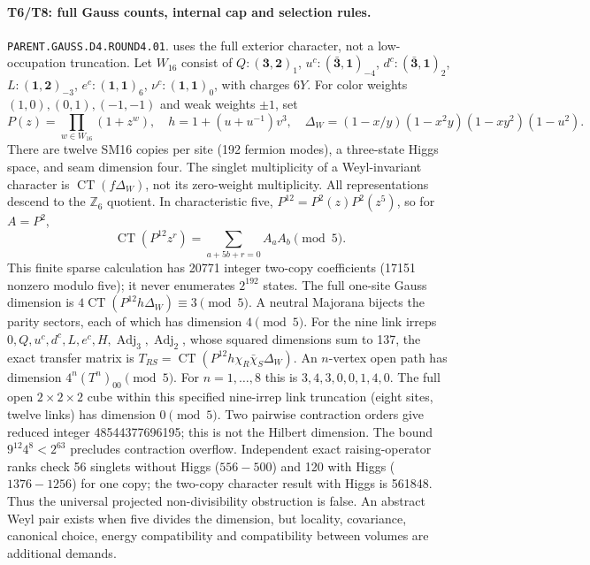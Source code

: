 \paragraph{T6/T8: full Gauss counts, internal cap and selection rules.}
\texttt{PARENT.GAUSS.D4.ROUND4.01}.
uses the full exterior character, not a low-occupation truncation.
Let $W_{16}$ consist of $Q:(\mathbf3,\mathbf2)_1$,
$u^c:(\bar{\mathbf3},\mathbf1)_{-4}$,
$d^c:(\bar{\mathbf3},\mathbf1)_2$, $L:(\mathbf1,\mathbf2)_{-3}$,
$e^c:(\mathbf1,\mathbf1)_6$, $\nu^c:(\mathbf1,\mathbf1)_0$, with charges $6Y$.
For color weights $(1,0),(0,1),(-1,-1)$ and weak weights $\pm1$, set
\[
 P(z)=\prod_{w\in W_{16}}(1+z^w),\quad
 h=1+(u+u^{-1})v^3,\quad
 \Delta_W=(1-x/y)(1-x^2y)(1-xy^2)(1-u^2).
\]
There are twelve SM16 copies per site (192 fermion modes), a three-state
Higgs space, and seam dimension four. The singlet multiplicity of a
Weyl-invariant character is $\operatorname{CT}(f\Delta_W)$, not its
zero-weight multiplicity. All representations descend to the $\mathbb Z_6$
quotient. In characteristic five,
$P^{12}=P^2(z)P^2(z^5)$, so for $A=P^2$,
\[
 \operatorname{CT}(P^{12}z^r)
   =\sum_{a+5b+r=0}A_aA_b\pmod5.
\]
This finite sparse calculation has 20771 integer two-copy coefficients
(17151 nonzero modulo five); it never enumerates $2^{192}$ states.
The full one-site Gauss dimension is $4\operatorname{CT}(P^{12}h\Delta_W)
\equiv3\pmod5$. A neutral Majorana bijects the parity sectors, each
of which has dimension $4\pmod5$.
For the nine link irreps $0,Q,u^c,d^c,L,e^c,H,\operatorname{Adj}_3,
\operatorname{Adj}_2$, whose squared dimensions sum to 137, the exact transfer
matrix is $T_{RS}=\operatorname{CT}(P^{12}h\chi_R\bar\chi_S\Delta_W)$.
An $n$-vertex open path has dimension $4^n(T^n)_{00}\pmod5$.
For $n=1,\ldots,8$ this is $3,4,3,0,0,1,4,0$.
The full open $2\times2\times2$ cube within this specified nine-irrep link
truncation (eight sites, twelve links) has
dimension $0\pmod5$. Two pairwise contraction orders give reduced integer
48544377696195; this is not the Hilbert dimension. The bound
$9^{12}4^8<2^{63}$ precludes contraction overflow.
Independent exact raising-operator ranks check 56 singlets without Higgs
($556-500$) and 120 with Higgs ($1376-1256$) for one copy; the two-copy
character result with Higgs is 561848. Thus the universal projected
non-divisibility obstruction is false. An abstract Weyl pair exists when
five divides the dimension, but locality, covariance, canonical choice,
energy compatibility and compatibility between volumes are additional demands.


